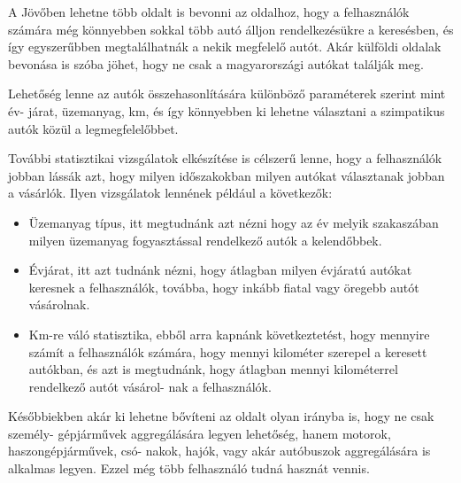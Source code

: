 

A Jövőben lehetne több oldalt is bevonni az oldalhoz, hogy a felhasználók számára még könnyebben sokkal több autó álljon rendelkezésükre a keresésben, és így egyszerűbben megtalálhatnák a nekik megfelelő autót. Akár külföldi oldalak bevonása is szóba jöhet, hogy ne csak a magyarországi autókat találják meg.


Lehetőség lenne az autók összehasonlítására különböző paraméterek szerint mint év-
járat, üzemanyag, km, és így könnyebben ki lehetne választani a szimpatikus autók közül a legmegfelelőbbet.


További statisztikai vizsgálatok elkészítése is célszerű lenne, hogy a felhasználók jobban lássák azt, hogy milyen időszakokban milyen autókat választanak jobban a vásárlók. Ilyen vizsgálatok lennének például a következők:

\begin{itemize}
\item Üzemanyag típus, itt megtudnánk azt nézni hogy az év melyik szakaszában milyen üzemanyag fogyasztással rendelkező autók a kelendőbbek.

\item Évjárat, itt azt tudnánk nézni, hogy átlagban milyen évjáratú autókat keresnek a felhasználók, továbba, hogy inkább fiatal vagy öregebb autót vásárolnak.

\item Km-re váló statisztika, ebből arra kapnánk következtetést, hogy mennyire számít a felhasználók számára, hogy mennyi kilométer szerepel a keresett autókban, és azt is megtudnánk, hogy átlagban mennyi kilométerrel rendelkező autót vásárol-
nak a felhasználók.
\end{itemize}


Későbbiekben akár ki lehetne bővíteni az oldalt olyan irányba is, hogy ne csak személy-
gépjárművek aggregálására legyen lehetőség, hanem motorok, haszongépjárművek, csó-
nakok, hajók, vagy akár autóbuszok aggregálására is alkalmas legyen. Ezzel még több felhasználó tudná hasznát vennis.